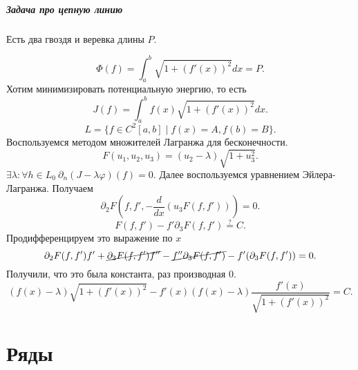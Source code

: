\paragraph{Задача про цепную линию}
Есть два гвоздя и веревка длины $ P$.

\[
    \Phi(f) =   \int_{a}^{b} \sqrt{ 1+ (f'(x))^2}  dx = P
.\] 
Хотим минимизировать потенциальную энергию, то есть
\[
    J(f) = \int_{a}^{b} f(x) \sqrt{1 + (f'(x))^2 } dx 
.\] 
\[
    L = \{f \in C^2[a, b] \mid f(x) = A, f(b) = B\}
.\] 
Воспользуемся методом множителей Лагранжа для бесконечности.
\[
    F(u_1, u_2, u_3) = (u_2-\lambda)\sqrt{ 1+ u_3^2 } 
.\] 
$ \exists \lambda\colon \forall h \in L_0 ~ \partial _n (J - \lambda \varphi )(f) = 0$.
Далее воспользуемся уравнением Эйлера-Лагранжа.
Получаем
\[
    \partial _2 F(f, f', -\frac{d}{dx}(u_3 F(f, f'))) = 0
.\] 
\[
    F(f, f') - f' \partial _3F(f, f') \stackrel{?}{=} C
.\] 
Продифференцируем это выражение по $ x$
\[
    \partial _2 F(f, f')f' + \cancel{ \partial _3 F(f, f') f''} - \cancel{ f'' \partial _3 F(f, f')} - f'(\partial _3 F(f, f')) = 0
.\] 
Получили, что это была константа, раз производная 0.
\[
    (f(x) - \lambda) \sqrt{ 1 + (f'(x))^2}  - f'(x) (f(x) - \lambda) \frac{f'(x)}{\sqrt{1+(f'(x))^2 } } = C
.\] 



\chapter{Ряды}
